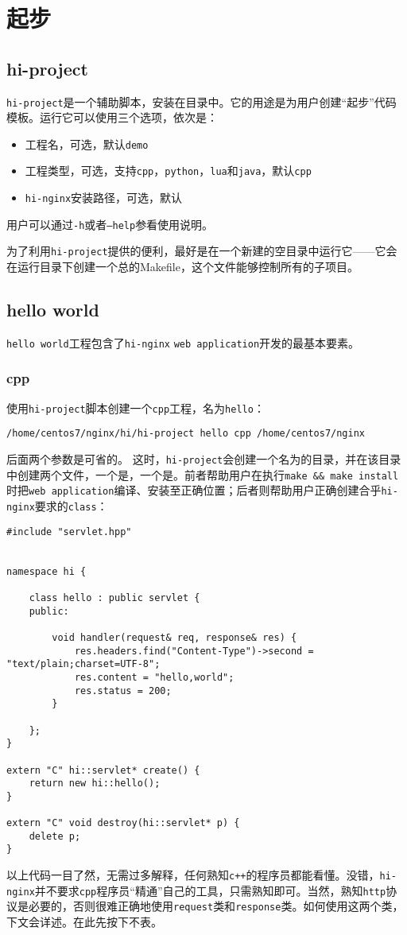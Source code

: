 \section{起步}
\subsection{hi-project}
\texttt{hi-project}是一个辅助脚本，安装在目录中。它的用途是为用户创建“起步”代码模板。运行它可以使用三个选项，依次是：
\begin{itemize}
\item 工程名，可选，默认\texttt{demo}
\item 工程类型，可选，支持\texttt{cpp}，\texttt{python}，\texttt{lua}和\texttt{java}，默认\texttt{cpp}
\item \texttt{hi-nginx}安装路径，可选，默认
\end{itemize}
用户可以通过\texttt{-h}或者\texttt{--help}参看使用说明。

为了利用\texttt{hi-project}提供的便利，最好是在一个新建的空目录中运行它——它会在运行目录下创建一个总的Makefile，这个文件能够控制所有的子项目。

\subsection{hello world}
\texttt{hello world}工程包含了\texttt{hi-nginx} \texttt{web application}开发的最基本要素。
\subsubsection{cpp}
使用\texttt{hi-project}脚本创建一个\texttt{cpp}工程，名为\texttt{hello}：
\begin{lstlisting}
/home/centos7/nginx/hi/hi-project hello cpp /home/centos7/nginx
\end{lstlisting}
后面两个参数是可省的。
这时，\texttt{hi-project}会创建一个名为的目录，并在该目录中创建两个文件，一个是，一个是。前者帮助用户在执行\texttt{make \&\& make install }时把\texttt{web application}编译、安装至正确位置；后者则帮助用户正确创建合乎\texttt{hi-nginx}要求的\texttt{class}：
\begin{lstlisting}
#include "servlet.hpp"


namespace hi {

    class hello : public servlet {
    public:

        void handler(request& req, response& res) {
            res.headers.find("Content-Type")->second = "text/plain;charset=UTF-8";
            res.content = "hello,world";
            res.status = 200;
        }

    };
}

extern "C" hi::servlet* create() {
    return new hi::hello();
}

extern "C" void destroy(hi::servlet* p) {
    delete p;
}
\end{lstlisting}
以上代码一目了然，无需过多解释，任何熟知\texttt{c++}的程序员都能看懂。没错，\texttt{hi-nginx}并不要求\texttt{cpp}程序员“精通”自己的工具，只需熟知即可。当然，熟知\texttt{http}协议是必要的，否则很难正确地使用\texttt{request}类和\texttt{response}类。如何使用这两个类，下文会详述。在此先按下不表。

